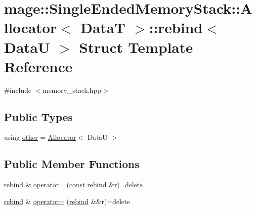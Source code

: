 \hypertarget{structmage_1_1_single_ended_memory_stack_1_1_allocator_1_1rebind}{}\section{mage\+:\+:Single\+Ended\+Memory\+Stack\+:\+:Allocator$<$ DataT $>$\+:\+:rebind$<$ DataU $>$ Struct Template Reference}
\label{structmage_1_1_single_ended_memory_stack_1_1_allocator_1_1rebind}


{\ttfamily \#include $<$memory\+\_\+stack.\+hpp$>$}

\subsection*{Public Types}
\begin{DoxyCompactItemize}
\item 
using \hyperlink{structmage_1_1_single_ended_memory_stack_1_1_allocator_1_1rebind_a8046a39ba6854ffa75978d58b0aafa02}{other} = \hyperlink{structmage_1_1_single_ended_memory_stack_1_1_allocator}{Allocator}$<$ DataU $>$
\end{DoxyCompactItemize}
\subsection*{Public Member Functions}
\begin{DoxyCompactItemize}
\item 
\hyperlink{structmage_1_1_single_ended_memory_stack_1_1_allocator_1_1rebind}{rebind} \& \hyperlink{structmage_1_1_single_ended_memory_stack_1_1_allocator_1_1rebind_a9449ba02ed51f463c71ae6dcb252b4f0}{operator=} (const \hyperlink{structmage_1_1_single_ended_memory_stack_1_1_allocator_1_1rebind}{rebind} \&r)=delete
\item 
\hyperlink{structmage_1_1_single_ended_memory_stack_1_1_allocator_1_1rebind}{rebind} \& \hyperlink{structmage_1_1_single_ended_memory_stack_1_1_allocator_1_1rebind_addeb41019900164bff956ca31d2f5051}{operator=} (\hyperlink{structmage_1_1_single_ended_memory_stack_1_1_allocator_1_1rebind}{rebind} \&\&r)=delete
\end{DoxyCompactItemize}
